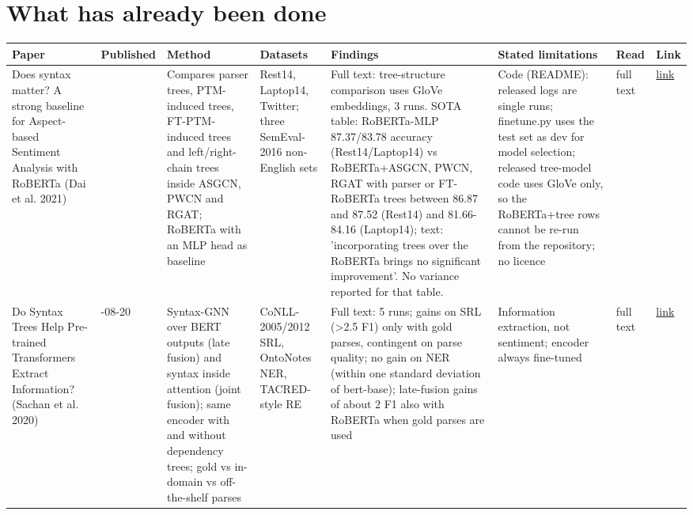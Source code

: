 \documentclass[11pt,a4paper]{article}
\begin{document}
\section{What has already been done}

{\small
\begin{longtable}{>{\raggedright\arraybackslash}p{}>{\raggedright\arraybackslash}p{}>{\raggedright\arraybackslash}p{}>{\raggedright\arraybackslash}p{}>{\raggedright\arraybackslash}p{}>{\raggedright\arraybackslash}p{}>{\raggedright\arraybackslash}p{}>{\raggedright\arraybackslash}p{}}
\toprule
\textbf{Paper} & \textbf{Published} & \textbf{Method} & \textbf{Datasets} & \textbf{Findings} & \textbf{Stated limitations} & \textbf{Read} & \textbf{Link} \\
\midrule
\endhead
Does syntax matter? A strong baseline for Aspect-based Sentiment Analysis with RoBERTa (Dai et al. 2021) & 2021 & Compares parser trees, PTM-induced trees, FT-PTM-induced trees and left/right-chain trees inside ASGCN, PWCN and RGAT; RoBERTa with an MLP head as baseline & Rest14, Laptop14, Twitter; three SemEval-2016 non-English sets & Full text: tree-structure comparison uses GloVe embeddings, 3 runs. SOTA table: RoBERTa-MLP 87.37/83.78 accuracy (Rest14/Laptop14) vs RoBERTa+ASGCN, PWCN, RGAT with parser or FT-RoBERTa trees between 86.87 and 87.52 (Rest14) and 81.66-84.16 (Laptop14); text: 'incorporating trees over the RoBERTa brings no significant improvement'. No variance reported for that table. & Code (README): released logs are single runs; finetune.py uses the test set as dev for model selection; released tree-model code uses GloVe only, so the RoBERTa+tree rows cannot be re-run from the repository; no licence & full text & \href{https://doi.org/10.18653/v1/2021.naacl-main.146}{link} \\
Do Syntax Trees Help Pre-trained Transformers Extract Information? (Sachan et al. 2020) & 2020-08-20 & Syntax-GNN over BERT outputs (late fusion) and syntax inside attention (joint fusion); same encoder with and without dependency trees; gold vs in-domain vs off-the-shelf parses & CoNLL-2005/2012 SRL, OntoNotes NER, TACRED-style RE & Full text: 5 runs; gains on SRL (>2.5 F1) only with gold parses, contingent on parse quality; no gain on NER (within one standard deviation of bert-base); late-fusion gains of about 2 F1 also with RoBERTa when gold parses are used & Information extraction, not sentiment; encoder always fine-tuned & full text & \href{https://arxiv.org/abs/2008.09084}{link} \\

\end{longtable}}
\end{document}
